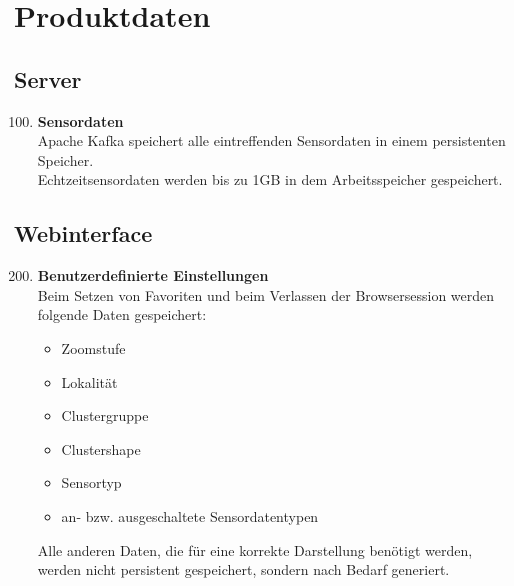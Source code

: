 \chapter{Produktdaten}
\section{Server}
\begin{enumerate}[label=\textbf{PD\arabic{enumi}0}]
	\setcounter{enumi}{99}
	\item \textbf{Sensordaten}\\
	Apache Kafka speichert alle eintreffenden Sensordaten in einem persistenten Speicher.\\
	Echtzeitsensordaten werden bis zu 1GB in dem Arbeitsspeicher gespeichert.
\end{enumerate}
\section{Webinterface}
\begin{enumerate}[label=\textbf{PD\arabic{enumi}0}]
	\setcounter{enumi}{199}
	\item \textbf{Benutzerdefinierte Einstellungen}\\
	Beim Setzen von Favoriten und beim Verlassen der Browsersession werden folgende Daten gespeichert:
	\begin{itemize}
		\item Zoomstufe
		\item Lokalität
		\item Clustergruppe
		\item Clustershape
		\item Sensortyp
		\item an- bzw. ausgeschaltete Sensordatentypen
	\end{itemize}
	Alle anderen Daten, die für eine korrekte Darstellung benötigt werden, werden nicht persistent gespeichert, sondern nach Bedarf generiert.
\end{enumerate}